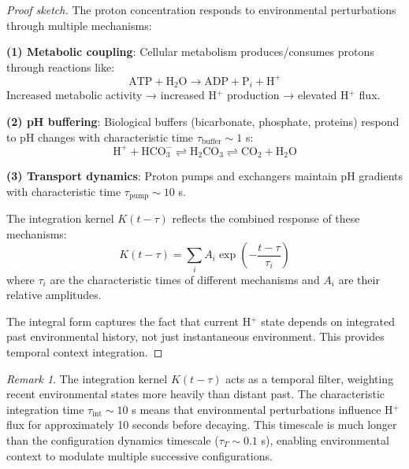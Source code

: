 \documentclass[aps,prd,twocolumn,superscriptaddress,floatfix,nofootinbib]{revtex4-2}
\theoremstyle{remark}
\newtheorem{remark}[theorem]{Remark}
\begin{document}
\begin{proof}[Proof sketch]
The proton concentration responds to environmental perturbations through multiple mechanisms:

\textbf{(1) Metabolic coupling}: Cellular metabolism produces/consumes protons through reactions like:
$$
\text{ATP} + \text{H}_2\text{O} \to \text{ADP} + \text{P}_i + \text{H}^+
$$
Increased metabolic activity → increased H$^+$ production → elevated H$^+$ flux.

\textbf{(2) pH buffering}: Biological buffers (bicarbonate, phosphate, proteins) respond to pH changes with characteristic time $\tau_{\text{buffer}} \sim 1$ s:
$$
\text{H}^+ + \text{HCO}_3^- \rightleftharpoons \text{H}_2\text{CO}_3 \rightleftharpoons \text{CO}_2 + \text{H}_2\text{O}
$$

\textbf{(3) Transport dynamics}: Proton pumps and exchangers maintain pH gradients with characteristic time $\tau_{\text{pump}} \sim 10$ s.

The integration kernel $K(t - \tau)$ reflects the combined response of these mechanisms:
$$
K(t - \tau) = \sum_i A_i \exp\left(-\frac{t - \tau}{\tau_i}\right)
$$
where $\tau_i$ are the characteristic times of different mechanisms and $A_i$ are their relative amplitudes.

The integral form captures the fact that current H$^+$ state depends on integrated past environmental history, not just instantaneous environment. This provides temporal context integration.
\end{proof}

\begin{remark}
The integration kernel $K(t - \tau)$ acts as a temporal filter, weighting recent environmental states more heavily than distant past. The characteristic integration time $\tau_{\text{int}} \sim 10$ s means that environmental perturbations influence H$^+$ flux for approximately 10 seconds before decaying. This timescale is much longer than the configuration dynamics timescale ($\tau_T \sim 0.1$ s), enabling environmental context to modulate multiple successive configurations.
\end{remark}
\end{document}

